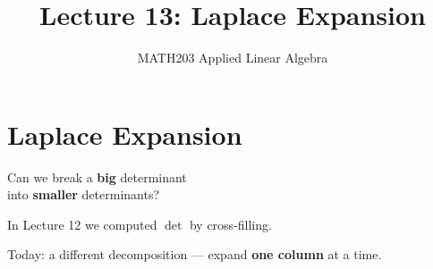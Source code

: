 \documentclass[10pt]{beamer}
\title{Lecture 13: Laplace Expansion}
\subtitle{MATH203 Applied Linear Algebra}
\date{}
\theoremstyle{definition}
\newcommand{\x}[1]{\alert{\textbf{#1}}}
\begin{document}
\maketitle


\section{Laplace Expansion}


\begin{frame}{}
\vfill
\begin{center}
{\Large Can we break a \x{big} determinant\\[6pt]
into \x{smaller} determinants?}
\end{center}
\vfill

In Lecture 12 we computed $\det$ by cross-filling.

\vfill

Today: a different decomposition --- expand \x{one column} at a time.

\vfill
\end{frame}
\end{document}
